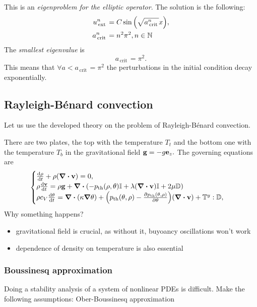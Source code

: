 \documentclass[reqno, a4paper]{article}
\begin{document}
	This is an \textit{eigenproblem for the elliptic operator}. The solution is the following:
	\begin{align*}
		u_{\, \text{ext} \,}^n &= C \sin\qty(\sqrt{a_{\, \text{crit} \,}^n}x), \\
		a^n_{\, \text{crit} \,} &= n^{2}\pi^{2}, n \in \N
	\end{align*}
The \textit{smallest eigenvalue} is
\[
	a_{\, \text{crit} \,} = \pi^{2}.
\]
This means that $\forall a < a_{\, \text{crit} \,} = \pi^{2}$ the perturbations in the initial condition decay exponentially.

\subsection{Rayleigh-Bénard convection}
\label{sec:convection}
Let us use the developed theory on the problem of Rayleigh-Bénard convection. 
\begin{tikzpicture}
\end{tikzpicture}
There are two plates, the top with the temperature $T_t$ and the bottom one with the temperature $T_b$ in the gravitational field $\vb{g}= - g \vb{e}_z.$ The governing equations are
\[
	\begin{cases}
		\dv{\rho}{t} + \rho \qty(\divergence{\vb{v}}) = 0, \\
		\rho \dv{\vb{v}}{t} = \rho \vb{g} + \divergence{\qty(-\pth\qty(\rho, \theta)\identity + \lambda \qty(\divergence{\vb{v}})\identity + 2 \mu \symvgrad)} \\
		\rho c_{V}\dv{\theta}{t} = \divergence{\qty(\kappa \grad \theta)}+\qty(\pth\qty(\theta, \rho)-\pdv{\pth\qty(\theta, \rho)}{\theta})\qty(\divergence{\vb{v}}) + \cstress : \symvgrad,
	\end{cases}
\]
Why something happens?
\begin{itemize}
	\item gravitational field is crucial, as without it, buyoancy oscillations won't work
	\item dependence of density on temperature is also essential
\end{itemize}

\subsubsection{Boussinesq approximation}
\label{sec:boussinesq_approximation}
Doing a stability analysis of a system of nonlinear PDEs is difficult. Make the following assumptions: Ober-Boussinesq approximation
\end{document}
